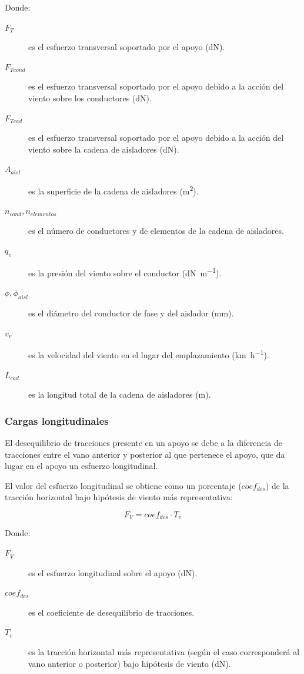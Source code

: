 Donde:
\begin{description}
    \item[$F_T$] es el esfuerzo transversal soportado por el apoyo (\si{\deca\newton}).
    \item[$F_{Tcond}$] es el esfuerzo transversal soportado por el apoyo debido a la acción del viento sobre los conductores (\si{\deca\newton}).
    \item[$F_{Tcad}$] es el esfuerzo transversal soportado por el apoyo debido a la acción del viento sobre la cadena de aisladores (\si{\deca\newton}).
    \item[$A_{aisl}$] es la superficie de la cadena de aisladores (\si{\meter\squared}).
    \item[$n_{cond}, n_{elementos}$] es el número de conductores y de elementos de la cadena de aisladores.
    \item[$q_v$] es la presión del viento sobre el conductor (\si{\deca\newton\per\meter}).
    \item[$\phi, \phi_{aisl}$] es el diámetro del conductor de fase y del aislador (\si{\milli\meter}).
    \item[$v_v$] es la velocidad del viento en el lugar del emplazamiento (\si{\kilo\meter\per\hour}).
    \item[$L_{cad}$] es la longitud total de la cadena de aisladores (\si{\meter}).
\end{description}
\subsubsection{Cargas longitudinales}
\label{subsubsec:apoyos-cargasL}
El desequilibrio de tracciones presente en un apoyo se debe a la diferencia de tracciones entre el vano anterior y posterior al que pertenece el apoyo, que da lugar en el apoyo un esfuerzo longitudinal.

El valor del esfuerzo longitudinal se obtiene como un porcentaje ($coef_{des}$) de la tracción horizontal bajo hipótesis de viento más representativa:

\begin{equation}
    F_V=coef_{des}\cdot T_v
    \label{eq:esfuerzo-vertical}
\end{equation}

Donde:
\begin{description}
    \item[$F_V$] es el esfuerzo longitudinal sobre el apoyo (\si{\deca\newton}).
    \item[$coef_{des}$] es el coeficiente de desequilibrio de tracciones.
    \item[$T_v$] es la tracción horizontal más representativa (según el caso corresponderá al vano anterior o posterior) bajo hipótesis de viento (\si{\deca\newton}).
\end{description}

